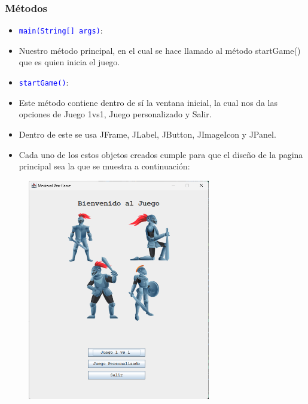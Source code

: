 \documentclass{article}
\begin{document}
\subsubsection{Métodos}
\begin{itemize}
    \item \texttt{\textcolor{blue}{main(String[] args)}}: 
    \item Nuestro método principal, en el cual se hace llamado al método startGame() que es quien inicia el juego.
\end{itemize}

\newpage 
\begin{itemize}
    \item \texttt{\textcolor{blue}{startGame()}}: 
    \item Este método contiene dentro de sí la ventana inicial, la cual nos da las opciones de Juego 1vs1, Juego personalizado y Salir.
    \item Dentro de este se usa JFrame, JLabel, JButton, JImageIcon y JPanel.
    \item Cada uno de los estos objetos creados cumple para que el diseño de la pagina principal sea la que se muestra a continuación:
\end{itemize}
\begin{figure}[H]
    \centering
    \includegraphics[width=0.71\textwidth,keepaspectratio]{img/vj1.png}
    \caption{}
\end{figure}
\end{document}
